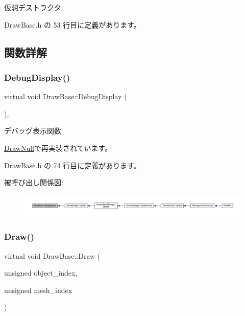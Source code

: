 仮想デストラクタ 



 Draw\+Base.\+h の 53 行目に定義があります。



\subsection{関数詳解}
\mbox{\label{class_draw_base_a2ba175f791ee01508ffb2be24c68fe7f}} 
\subsubsection{\texorpdfstring{Debug\+Display()}{DebugDisplay()}}
{\footnotesize\ttfamily virtual void Draw\+Base\+::\+Debug\+Display (\begin{DoxyParamCaption}{ }\end{DoxyParamCaption})\hspace{0.3cm}{\ttfamily [inline]}, {\ttfamily [virtual]}}



デバッグ表示関数 



\mbox{\hyperlink{class_draw_null_aa78d05c51ff3943888678b9b2c6bd027}{Draw\+Null}}で再実装されています。



 Draw\+Base.\+h の 74 行目に定義があります。

被呼び出し関係図\+:
\nopagebreak
\begin{figure}[H]
\begin{center}
\leavevmode
\includegraphics[width=350pt]{class_draw_base_a2ba175f791ee01508ffb2be24c68fe7f_icgraph}
\end{center}
\end{figure}
\mbox{\label{class_draw_base_a408080106630a1146d7af0bb46a4d8d1}} 
\subsubsection{\texorpdfstring{Draw()}{Draw()}}
{\footnotesize\ttfamily virtual void Draw\+Base\+::\+Draw (\begin{DoxyParamCaption}\item[{unsigned}]{object\+\_\+index,  }\item[{unsigned}]{mesh\+\_\+index }\end{DoxyParamCaption})\hspace{0.3cm}{\ttfamily [pure virtual]}}



